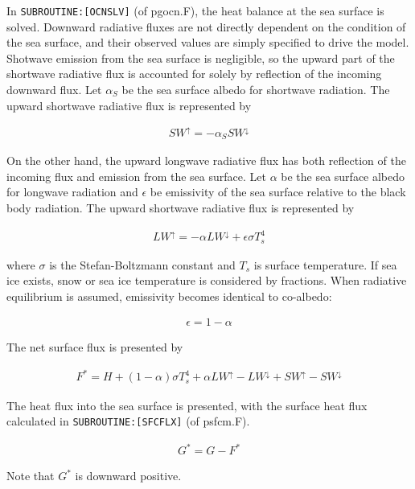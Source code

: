 \begin{itemize}
In \texttt{SUBROUTINE:{[}OCNSLV{]}} (of pgocn.F), the heat balance at
the sea surface is solved. Downward radiative fluxes are not directly
dependent on the condition of the sea surface, and their observed values
are simply specified to drive the model. Shotwave emission from the sea
surface is negligible, so the upward part of the shortwave radiative
flux is accounted for solely by reflection of the incoming downward
flux. Let \(\alpha _S\) be the sea surface albedo for shortwave
radiation. The upward shortwave radiative flux is represented by

\begin{eqnarray}
    SW^\uparrow = - \alpha_S SW^\downarrow
\end{eqnarray}

On the other hand, the upward longwave radiative flux has both
reflection of the incoming flux and emission from the sea surface. Let
\(\alpha\) be the sea surface albedo for longwave radiation and
\(\epsilon\) be emissivity of the sea surface relative to the black body
radiation. The upward shortwave radiative flux is represented by

\begin{eqnarray}
    LW^\uparrow = - \alpha LW^\downarrow + \epsilon \sigma T_s ^4
\end{eqnarray}

where \(\sigma\) is the Stefan-Boltzmann constant and \(T_s\) is surface
temperature. If sea ice exists, snow or sea ice temperature is
considered by fractions. When radiative equilibrium is assumed,
emissivity becomes identical to co-albedo:

\begin{eqnarray}
    \epsilon = 1 - \alpha
\end{eqnarray}

The net surface flux is presented by

\begin{eqnarray}
    F^*=H + (1-\alpha)\sigma T_s^4 + \alpha LW^\uparrow - LW^\downarrow +SW^\uparrow - SW^\downarrow        
\end{eqnarray}

The heat flux into the sea surface is presented, with the surface heat
flux calculated in \texttt{SUBROUTINE:{[}SFCFLX{]}} (of psfcm.F).

\begin{eqnarray}
    G^* = G - F^*
\end{eqnarray}

Note that \(G^*\) is downward positive.


\end{itemize}
